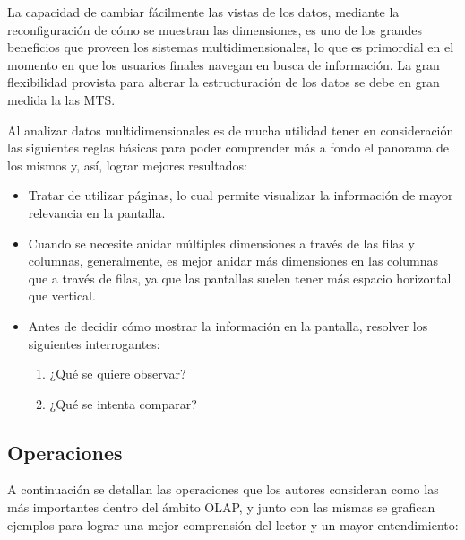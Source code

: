 \documentclass[a4paper,11pt]{article}
\begin{document}
    
    La capacidad de cambiar fácilmente las vistas de los datos, mediante la reconfiguración de cómo se muestran las dimensiones, es uno de los grandes beneficios
    que proveen los sistemas multidimensionales, lo que es primordial en el momento en que los usuarios finales navegan en busca de información. La gran
    flexibilidad provista para alterar la estructuración de los datos se debe en gran medida la las MTS.\par
    
    \vspace{0.2in}
    Al analizar datos multidimensionales es de mucha utilidad tener en consideración las siguientes reglas básicas para poder comprender más a fondo el panorama
    de los mismos y, así, lograr mejores resultados:
    
    \begin{itemize}
      \item Tratar de utilizar páginas, lo cual permite visualizar la información de mayor relevancia en la pantalla.
      \item Cuando se necesite anidar múltiples dimensiones a través de las filas y columnas, generalmente, es mejor anidar más dimensiones en las columnas que
      a través de filas, ya que las pantallas suelen tener más espacio horizontal que vertical.
      \item Antes de decidir cómo mostrar la información en la pantalla, resolver los siguientes interrogantes:
        \begin{enumerate}
          \item ¿Qué se quiere observar?
          \item ¿Qué se intenta comparar?
        \end{enumerate}
    \end{itemize}
    
    
    \subsection{Operaciones}
    
    A continuación se detallan las operaciones que los autores consideran como las más importantes dentro del ámbito OLAP, y junto con las mismas se grafican
    ejemplos para lograr una mejor comprensión del lector y un mayor entendimiento:
    
\end{document}
